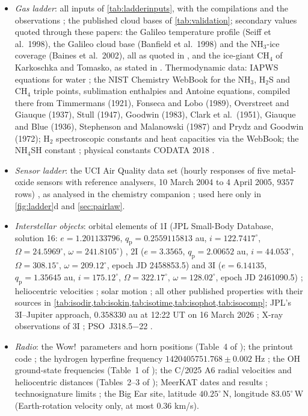\documentclass[11pt]{article}
\theoremstyle{definition}\newtheorem{definition}[theorem]{Definition}
\theoremstyle{remark}\newtheorem{remark}[theorem]{Remark}
\begin{document}
\begin{itemize}
\item \emph{Gas ladder}: all inputs of \cref{tab:ladderinputs}, with the compilations \cite{Atreya2020,AtreyaWong} and the observations \cite{Wong2004,Li2017,Li2020,Guillot2020a,Guillot2020b,Fletcher2009,Sromovsky2013,Molter2021,Irwin2018,Irwin2019a,Irwin2019b,dePater1991}; the published cloud bases of \cref{tab:validation}; secondary values quoted through these papers: the Galileo temperature profile (Seiff et al.\ 1998), the Galileo cloud base (Banfield et al.\ 1998) and the NH$_3$-ice coverage (Baines et al.\ 2002), all as quoted in \cite{AtreyaWong,Guillot2020b}, and the ice-giant CH$_4$ of Karkoschka and Tomasko, as stated in \cite{Irwin2019b}. Thermodynamic data: IAPWS equations for water \cite{WagnerPruss,Wagner2011}; the NIST Chemistry WebBook \cite{NISTWebBook} for the NH$_3$, H$_2$S and CH$_4$ triple points, sublimation enthalpies and Antoine equations, compiled there from Timmermans (1921), Fonseca and Lobo (1989), Overstreet and Giauque (1937), Stull (1947), Goodwin (1983), Clark et al.\ (1951), Giauque and Blue (1936), Stephenson and Malanowski (1987) and Prydz and Goodwin (1972); H$_2$ spectroscopic constants \cite{HuberHerzberg} and heat capacities \cite{Leachman} via the WebBook; the NH$_4$SH constant \cite{AtreyaWong}; physical constants CODATA 2018 \cite{CODATA}.
\item \emph{Sensor ladder}: the UCI Air Quality data set (hourly responses of five metal-oxide sensors with reference analysers, 10 March 2004 to 4 April 2005, $9357$ rows) \cite{UCI,DeVito}, as analysed in the chemistry companion \cite{SChem}; used here only in \cref{fig:ladder}d and \cref{sec:pairlaw}.
\item \emph{Interstellar objects}: orbital elements of 1I (JPL Small-Body Database, solution 16: $e=1.201133796$, $q_\mathrm{p}=0.2559115813$ au, $i=122.7417^\circ$, $\Omega=24.5969^\circ$, $\omega=241.8105^\circ$) \cite{JPL1I}, 2I ($e=3.3565$, $q_\mathrm{p}=2.00652$ au, $i=44.053^\circ$, $\Omega=308.15^\circ$, $\omega=209.12^\circ$, epoch JD 2458853.5) \cite{W2I} and 3I ($e=6.14135$, $q_\mathrm{p}=1.35645$ au, $i=175.12^\circ$, $\Omega=322.17^\circ$, $\omega=128.02^\circ$, epoch JD 2461090.5) \cite{W3I}; heliocentric velocities \cite{Mamajek17,TS25,dlFM25}; solar motion \cite{SBD10}; all other published properties with their sources in \cref{tab:isodir,tab:isokin,tab:isotime,tab:isophot,tab:isocomp}; JPL's 3I--Jupiter approach, $0.358330$ au at 12:22 UT on 16 March 2026 \cite{W3I}; X-ray observations of 3I \cite{ESAXRISM}; PSO~J318.5$-$22 \cite{Biller18}.
\item \emph{Radio}: the Wow!\ parameters and horn positions (Table~4 of \cite{Mendez25}); the printout code \cite{Ehman}; the hydrogen hyperfine frequency $1420405751.768\pm0.002$ Hz \cite{Hellwig}; the OH ground-state frequencies (Table~1 of \cite{Jiang}); the C/2025 A6 radial velocities and heliocentric distances (Tables~2--3 of \cite{Jiang}); MeerKAT dates and results \cite{UCT,AstroBio,ATel}; technosignature limits \cite{UCT,Sheikh,BL}; the Big Ear site, latitude $40.25^\circ$\,N, longitude $83.05^\circ$\,W (Earth-rotation velocity only, at most $0.36$ km/s).

\end{itemize}
\end{document}

